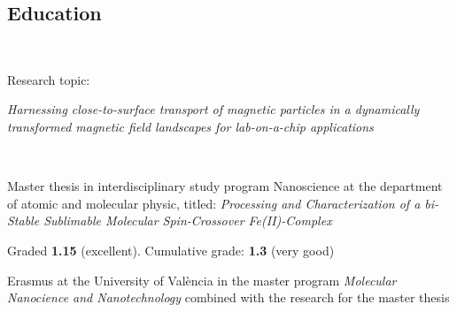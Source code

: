 \begin{adjustwidth}{2.5cm}{1.9cm}
\vspace{10mm}
\section{Education}
\justifying
\\
\vspace{\topsep} %
\begin{tightemize} \vspace{-3pt}
\item Research topic: 

\textit{Harnessing close-to-surface transport of magnetic particles in a dynamically transformed magnetic field landscapes for lab-on-a-chip applications}
\end{tightemize}

\sectionsep

\\
\begin{tightemize} \vspace{-3pt}
\item Master thesis in interdisciplinary study program Nanoscience at the department of atomic and molecular physic, titled: \textit{Processing and Characterization of a bi-Stable Sublimable Molecular Spin-Crossover Fe(II)-Complex}

Graded \textbf{1.15} (excellent). Cumulative grade: \textbf{1.3} (very good)
\end{tightemize}

\begin{tightemize} \vspace{-3pt}
\item Erasmus at the University of València in the master program \textit{Molecular Nanocience and Nanotechnology} combined with the research for the master thesis
\end{tightemize}


\end{adjustwidth}
